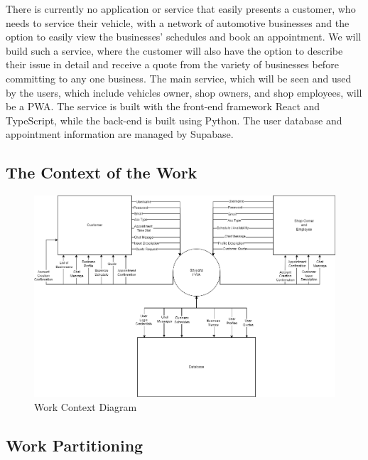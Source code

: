 \documentclass[12pt]{article}
\begin{document}
There is currently no application or service that easily presents a customer, who needs to service their vehicle, with a network of automotive businesses and the option to easily view the businesses' schedules and book an appointment. We will build such a service, where the customer will also have the option to describe their issue in detail and receive a quote from the variety of businesses before committing to any one business. The main service, which will be seen and used by the users, which include vehicles owner, shop owners, and shop employees, will be a PWA. The service is built with the front-end framework React and TypeScript, while the back-end is built using Python. The user database and appointment information are managed by Supabase. 
\subsection{The Context of the Work}

\begin{figure}[H]
    \centering
    \includegraphics[scale=0.5]{SRS/wcd.png}
    \caption{Work Context Diagram}
    \label{fig:wcd}
\end{figure}

\subsection{Work Partitioning}
\end{document}
